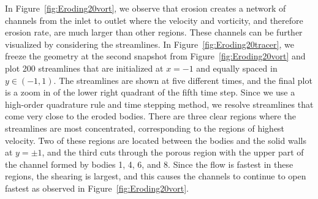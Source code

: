 \documentclass[preprint,10pt]{elsarticle}
\begin{document}
In Figure~\ref{fig:Eroding20vort}, we observe that erosion creates a
network of channels from the inlet to outlet where the velocity and
vorticity, and therefore erosion rate, are much larger than other
regions.  These channels can be further visualized by considering the
streamlines.  In Figure~\ref{fig:Eroding20tracer}, we freeze the
geometry at the second snapshot from Figure~\ref{fig:Eroding20vort} and plot 200 streamlines that are initialized at $x=-1$ and equally
spaced in $y \in (-1,1)$.  The streamlines are shown at five different
times, and the final plot is a zoom in of the lower right quadrant of
the fifth time step.  Since we use a high-order quadrature rule and time
stepping method, we resolve streamlines that come very close to the
eroded bodies.  There are three clear regions where the streamlines are
most concentrated, corresponding to the regions of highest velocity.
Two of these regions are located between the bodies and the solid walls
at $y=\pm 1$, and the third cuts through the porous region with the
upper part of the channel formed by bodies 1, 4, 6, and 8.
 Since the flow is
fastest in these regions, the shearing is largest, and this causes the
channels to continue to open fastest as observed in
Figure~\ref{fig:Eroding20vort}.
\end{document}
